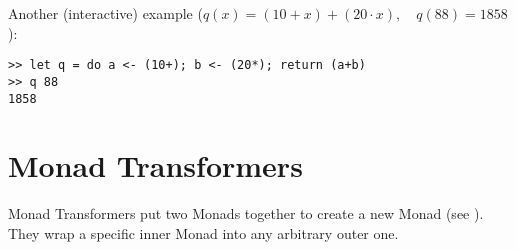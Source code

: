 \documentclass[a4paper]{article}
\begin{document}
Another (interactive) example ($q(x)=(10+x)+(20\cdot x),\quad q(88)=1858$):
\begin{verbatim}
>> let q = do a <- (10+); b <- (20*); return (a+b)
>> q 88
1858
\end{verbatim}

\section{Monad Transformers}

Monad Transformers put two Monads together to create a new Monad (see
). They wrap a specific inner Monad into any arbitrary outer one.
\end{document}
